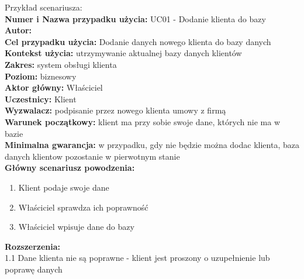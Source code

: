 Przykład scenariusza: \\
\textbf{Numer i Nazwa przypadku użycia:} UC01 - Dodanie klienta do bazy \\
\textbf{Autor:} \\
\textbf{Cel przypadku użycia:} Dodanie danych nowego klienta do bazy danych \\
\textbf{Kontekst użycia:} utrzymywanie aktualnej bazy danych klientów \\
\textbf{Zakres:} system obsługi klienta \\
\textbf{Poziom:} biznesowy \\
\textbf{Aktor główny:} Właściciel \\
\textbf{Uczestnicy:} Klient \\
\textbf{Wyzwalacz:} podpisanie przez nowego klienta umowy z firmą \\
\textbf{Warunek początkowy:} klient ma przy sobie swoje dane, których nie ma w bazie \\
\textbf{Minimalna gwarancja:} w przypadku, gdy nie będzie można dodac klienta, baza danych klientow pozostanie w pierwotnym stanie \\
\textbf{Główny scenariusz powodzenia:} \\
	\begin{enumerate}
		\item Klient podaje swoje dane
		\item Właściciel sprawdza ich poprawność
		\item Właściciel wpisuje dane do bazy 
	\end{enumerate}
\textbf{Rozszerzenia:} \\
1.1 Dane klienta nie są poprawne - klient jest proszony o uzupełnienie lub poprawę danych
